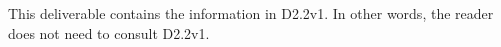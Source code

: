 \documentclass[a4paper, twoside, 11pt]{article}
\begin{document}
This deliverable contains the information in D2.2v1. In other words, the reader does not need to consult D2.2v1.

\clearpage

\tableofcontents
\clearpage
\listoffigures %




\clearpage
\sloppy























\appendix
\clearpage
{}


\label{lastpage}
\end{document}

